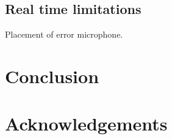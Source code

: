






\subsection*{Real time limitations}
Placement of error microphone.


\section{Conclusion}

\section*{Acknowledgements}
